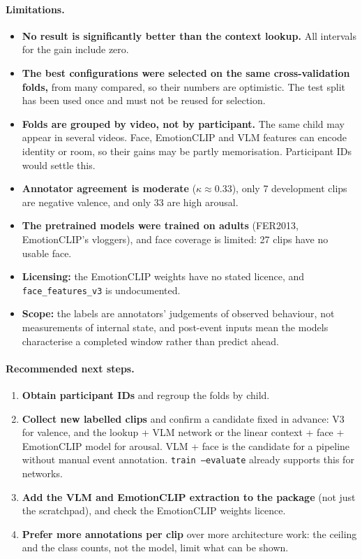 \documentclass[11pt]{article}
\newcommand{\code}[1]{\texttt{#1}}
\begin{document}
\paragraph{Limitations.}
\begin{itemize}
  \item \textbf{No result is significantly better than the context lookup.} All intervals for the gain include zero.
  \item \textbf{The best configurations were selected on the same cross-validation folds,} from many compared, so their numbers are optimistic. The test split has been used once and must not be reused for selection.
  \item \textbf{Folds are grouped by video, not by participant.} The same child may appear in several videos. Face, EmotionCLIP and VLM features can encode identity or room, so their gains may be partly memorisation. Participant IDs would settle this.
  \item \textbf{Annotator agreement is moderate} ($\kappa \approx 0.33$), only 7 development clips are negative valence, and only 33 are high arousal.
  \item \textbf{The pretrained models were trained on adults} (FER2013, EmotionCLIP's vloggers), and face coverage is limited: 27 clips have no usable face.
  \item \textbf{Licensing:} the EmotionCLIP weights have no stated licence, and \code{face\_features\_v3} is undocumented.
  \item \textbf{Scope:} the labels are annotators' judgements of observed behaviour, not measurements of internal state, and post-event inputs mean the models characterise a completed window rather than predict ahead.
\end{itemize}

\paragraph{Recommended next steps.}
\begin{enumerate}
  \item \textbf{Obtain participant IDs} and regroup the folds by child.
  \item \textbf{Collect new labelled clips} and confirm a candidate fixed in advance: V3 for valence, and the lookup + VLM network or the linear context + face + EmotionCLIP model for arousal. VLM + face is the candidate for a pipeline without manual event annotation. \code{train --evaluate} already supports this for networks.
  \item \textbf{Add the VLM and EmotionCLIP extraction to the package} (not just the scratchpad), and check the EmotionCLIP weights licence.
  \item \textbf{Prefer more annotations per clip} over more architecture work: the ceiling and the class counts, not the model, limit what can be shown.
\end{enumerate}
\end{document}
